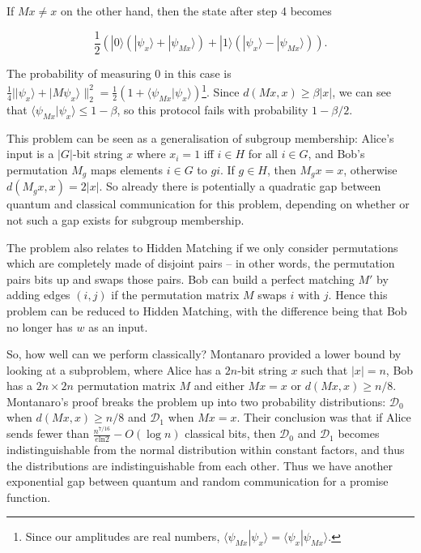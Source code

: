 \documentclass[a4paper]{article}
\begin{document}
        If $Mx \neq x$ on the other hand, then the state after step 4 becomes

        $$\frac{1}{2}(|0\rangle(|\psi_x\rangle + |\psi_{Mx}\rangle) + |1\rangle(|\psi_x\rangle - |\psi_{Mx}\rangle)).$$

        The probability of measuring $0$ in this case is $\frac{1}{4}||\psi_x\rangle + |M\psi_x\rangle\|_2^2 = \frac{1}{2}(1 + \langle\psi_{Mx}|\psi_x\rangle)$\footnote{Since our amplitudes are real numbers, $\langle\psi_{Mx}|\psi_x\rangle = \langle\psi_x|\psi_{Mx}\rangle$.}. Since $d(Mx, x) \geq \beta|x|$, we can see that $\langle\psi_{Mx}|\psi_x\rangle \leq 1 - \beta$, so this protocol fails with probability $1 - \beta/2$.

        This problem can be seen as a generalisation of subgroup membership: Alice's input is a $|G|$-bit string $x$ where $x_i = 1$ iff $i \in H$ for all $i \in G$, and Bob's permutation $M_g$ maps elements $i \in G$ to $gi$. If $g \in H$, then $M_gx = x$, otherwise $d(M_gx, x) = 2|x|$. So already there is potentially a quadratic gap between quantum and classical communication for this problem, depending on whether or not such a gap exists for subgroup membership.

        The problem also relates to Hidden Matching if we only consider permutations which are completely made of disjoint pairs -- in other words, the permutation pairs bits up and swaps those pairs. Bob can build a perfect matching $M'$ by adding edges $(i, j)$ if the permutation matrix $M$ swaps $i$ with $j$. Hence this problem can be reduced to Hidden Matching, with the difference being that Bob no longer has $w$ as an input.

        So, how well can we perform classically? Montanaro \cite{Montanaro:2011:NES:2230916.2230919} provided a lower bound by looking at a subproblem, where Alice has a $2n$-bit string $x$ such that $|x| = n$, Bob has a $2n \times 2n$ permutation matrix $M$ and either $Mx = x$ or $d(Mx, x) \geq n/8$. Montanaro's proof breaks the problem up into two probability distributions: $\mathcal{D}_0$ when $d(Mx, x) \geq n/8$ and $\mathcal{D}_1$ when $Mx = x$. Their conclusion was that if Alice sends fewer than $\frac{n^{7/16}}{e\textrm{ln}2} - O(\log n)$ classical bits, then $\mathcal{D}_0$ and $\mathcal{D}_1$ becomes indistinguishable from the normal distribution within constant factors, and thus the distributions are indistinguishable from each other. Thus we have another exponential gap between quantum and random communication for a promise function.
\end{document}
